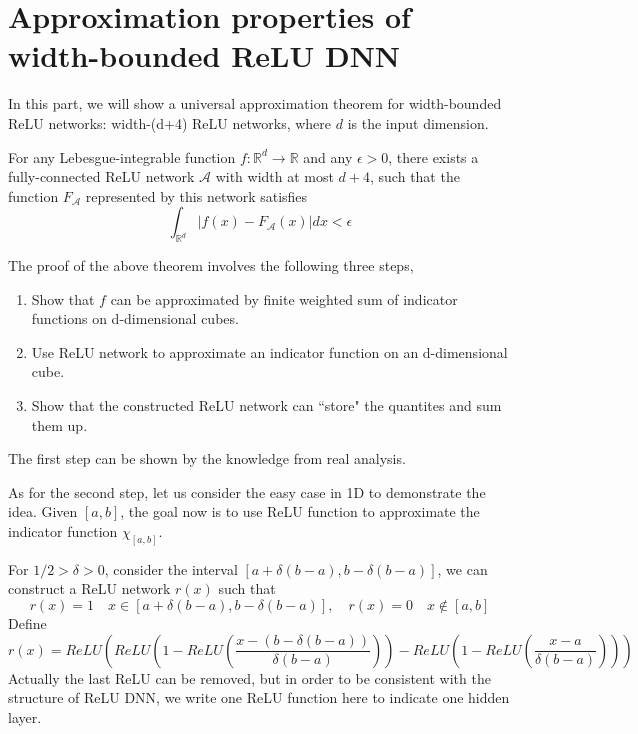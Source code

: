 \chapter{Approximation properties of width-bounded ReLU DNN}
In this part, we will show a universal approximation theorem for width-bounded ReLU networks: width-(d+4) ReLU networks, where $d$ is the input dimension.

\begin{theorem}
	\label{width-bdd}
	For any Lebesgue-integrable function $f:\mathbb{R}^d\to\mathbb{R}$ and any $\epsilon>0$, there exists a fully-connected ReLU network $\mathcal{A}$ with width at most $d+4$, such that the function 
	$F_{\mathcal{A}}$ represented by this network satisfies
	\begin{equation}
	\int_{\mathbb{R}^d}|f(x)-F_{\mathcal{A}}(x) |dx<\epsilon
	\end{equation}
\end{theorem}
The proof of the above theorem involves the following three steps,
\begin{enumerate}
	\item Show that $f$ can be approximated by finite weighted sum of indicator functions on d-dimensional cubes.
	\item  Use ReLU network to approximate an indicator function on an d-dimensional cube. 
	\item  Show that the constructed ReLU network can ``store" the quantites and sum them up.
\end{enumerate}
 The first step can be shown by the knowledge from real analysis.
 
 As for the second step, let us consider the easy case in 1D to demonstrate the idea. Given $[a,b]$, the goal now is to use ReLU function to approximate the indicator function $\chi_{[a,b]}$.
 
 For $1/2>\delta>0$, consider the interval $[a+\delta(b-a),b-\delta(b-a)]$, we can construct a ReLU network $r(x)$ such that 
 $$
 r(x)=1\quad x\in[a+\delta(b-a),b-\delta(b-a)],\quad r(x)=0\quad x\notin[a,b]
 $$
 Define 
 $$
 r(x)=ReLU(ReLU(1-ReLU(\frac{x-(b-\delta(b-a))}{\delta(b-a)}))-ReLU(1-ReLU(\frac{x-a}{\delta(b-a)})))
 $$
 Actually the last ReLU can be removed, but in order to be consistent with the structure of ReLU DNN, we write one ReLU function here to indicate one hidden layer.

